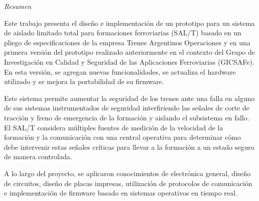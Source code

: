 
\vspace*{\fill}

\begin{center}

{\huge \textit{Resumen}}


\vspace{1.5cm}

\begin{adjustwidth}{2cm}{2cm}
\begin{center}
    

        
Este trabajo presenta el diseño e implementación de un prototipo para un sistema de aislado limitado total para formaciones ferroviarias (SAL/T) basado en un pliego de especificaciones de la empresa Trenes Argentinos Operaciones y en una primera versión del prototipo realizado anteriormente en el contexto del Grupo de Investigación en Calidad y Seguridad de las Aplicaciones Ferroviarias (GICSAFe). En esta versión, se agregan nuevas funcionalidades, se actualiza el hardware utilizado y se mejora la portabilidad de su firmware. \\

\vspace{.8cm}

Este sistema permite aumentar la seguridad de los trenes ante una falla en alguno de sus sistemas instrumentados de seguridad interfiriendo las señales de corte de tracción y freno de emergencia de la formación y aislando el subsistema en fallo. El SAL/T considera múltiples fuentes de medición de la velocidad de la formación y la comunicación con una central operativa para determinar cómo debe intervenir estas señales críticas para llevar a la formación a un estado seguro de manera controlada.  \\ 

\vspace{.8cm}

A lo largo del proyecto, se aplicaron conocimientos de electrónica general, diseño de circuitos, diseño de placas impresas, utilización de protocolos de comunicación e implementación de firmware basado en sistemas operativos en tiempo real.


\end{center}
\end{adjustwidth}

\end{center}

\vspace{8cm}

\vspace*{\fill}

